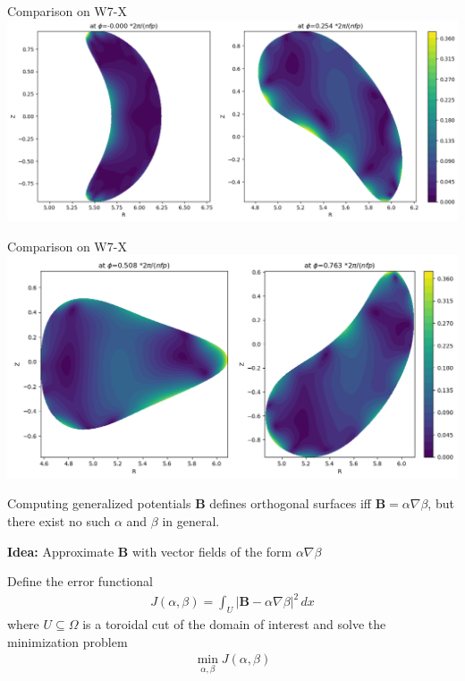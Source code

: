 \documentclass[
	english,%
	logo=false,%
	eurofusion=false, %
	titlegraphic=true, %
	]{ippbeamer}
\begin{document}
\begin{frame}{Comparison on W7-X}
	\includegraphics[width=\textwidth]{plots/compare_for_w7x_gvec_dommaschk_on_gvecdata_upper_plots.png}
\end{frame}

\begin{frame}{Comparison on W7-X}
	\includegraphics[width=\textwidth]{plots/compare_for_w7x_gvec_dommaschk_on_gvecdata_lower_plots.png}
\end{frame}


\begin{frame}{Computing generalized potentials}
	$\mathbf{B}$ defines orthogonal surfaces 
	iff $\mathbf{B} = \alpha \nabla \beta$, but there exist no such $\alpha$ and $\beta$ in general.

	\begin{exampleblock}{}
		\textbf{Idea:} Approximate $\mathbf{B}$  with vector fields of the form $\alpha \nabla \beta$
	\end{exampleblock}

	Define the error functional 
	\begin{align*}
		J(\alpha, \beta) = \int_U \left| \mathbf{B} - \alpha \nabla \beta \right|^2 \, dx
	\end{align*}
	where $U \subseteq \Omega$ is a toroidal cut of the domain of interest
	and solve the minimization problem
	\begin{align*}
		\min_{\alpha, \beta} J(\alpha, \beta)
	\end{align*}

\end{frame}
\end{document}

